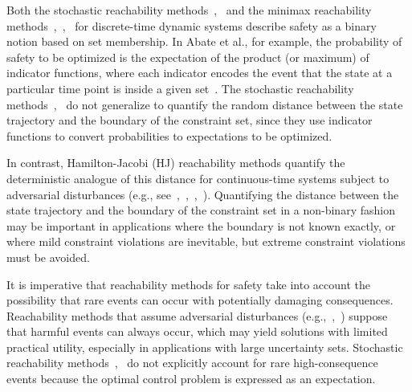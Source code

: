 \documentclass[letterpaper, 10 pt, conference]{ieeeconf}  %
\begin{document}
Both the stochastic reachability methods~\cite{abate2008probabilistic},~\cite{summers2010verification} and the minimax reachability methods~\cite{bertsekas1971control},~\cite{bertsekas1971minimax},~\cite{bertsekas2005dynamic} for discrete-time dynamic systems
describe safety as a binary notion based on set membership.
In Abate et al., for example, the probability of safety to be optimized is the expectation of the product (or maximum)
of indicator functions, where each indicator encodes the event that the state at a particular time point is inside a given set~\cite{abate2008probabilistic}.
The stochastic reachability methods~\cite{abate2008probabilistic},~\cite{summers2010verification} 
do not generalize to quantify the random distance between the state trajectory and the boundary of the constraint set,
since they use indicator functions to convert probabilities to expectations to be optimized.

In contrast, Hamilton-Jacobi (HJ) reachability methods quantify the deterministic analogue of this distance
for continuous-time systems subject to adversarial disturbances 
(e.g., see~\cite{bansal2017hamilton},~\cite{herbert2017fastrack},~\cite{EECS-2018-41},~\cite{mitchell2005toolbox}).
Quantifying the distance between the state trajectory and the boundary of the constraint set in a non-binary fashion
may be important in applications where the boundary is not known exactly,
or where mild constraint violations are inevitable, but extreme constraint violations must be avoided.

It is imperative that reachability methods for safety take into account the possibility that rare events can occur
with potentially damaging consequences. 
Reachability methods that assume adversarial disturbances (e.g.,~\cite{bansal2017hamilton},~\cite{bertsekas1971minimax}) suppose that harmful events can always occur,
which may yield solutions with limited practical utility, especially in applications with large uncertainty sets.
Stochastic reachability methods~\cite{abate2008probabilistic},~\cite{summers2010verification} do not explicitly account for rare high-consequence events
because the optimal control problem is expressed as an expectation. 
\end{document}
